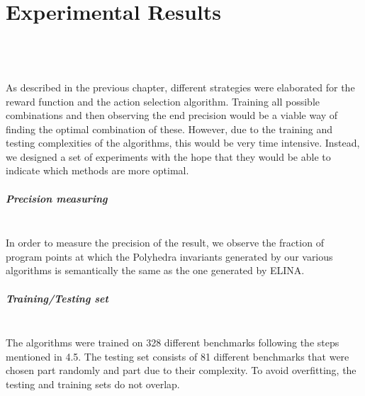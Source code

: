 
\chapter{Experimental Results}
\mbox{}\\
\mbox{}\\
\mbox{}\\
As described in the previous chapter, different strategies were elaborated for the reward function and the action selection algorithm. Training all possible combinations and then observing the end precision would be a viable way of finding the optimal combination of these. However, due to the training and testing complexities of the algorithms, this would be very time intensive. Instead, we designed a set of experiments with the hope that they would be able to indicate which methods are more optimal.
\paragraph{Precision measuring}\mbox{}\\
In order to measure the precision of the result, we observe the fraction of program points at which the Polyhedra invariants generated by our various algorithms is semantically the same as the one generated by ELINA.
\paragraph{Training/Testing set}\mbox{}\\
The algorithms were trained on 328 different benchmarks following the steps mentioned in 4.5. The testing set consists of 81 different benchmarks that were chosen part randomly and part due to their complexity. To avoid overfitting, the testing and training sets do not overlap.


